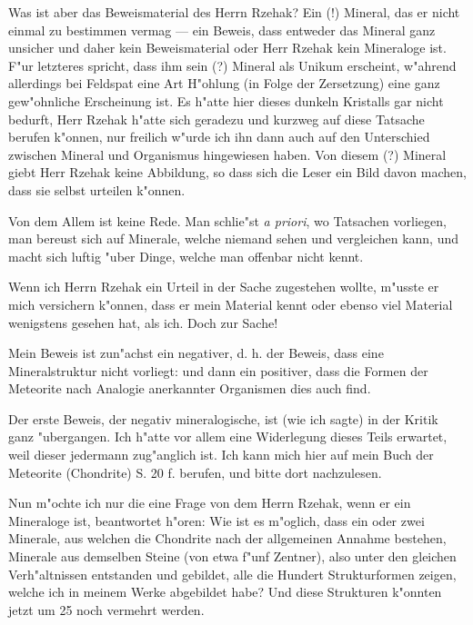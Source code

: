 \documentclass[a4paper, 12pt, oneside]{article}
\begin{document}
Was ist aber das Beweismaterial des Herrn Rzehak? Ein (!) Mineral, das er nicht einmal zu bestimmen vermag --- ein Beweis, dass entweder das Mineral ganz unsicher und daher kein Beweismaterial oder Herr Rzehak kein Mineraloge ist. F"ur letzteres spricht, dass ihm sein (?) Mineral als Unikum erscheint, w"ahrend allerdings bei Feldspat eine Art H"ohlung (in Folge der Zersetzung) eine ganz gew"ohnliche Erscheinung ist. Es h"atte hier dieses dunkeln Kristalls gar nicht bedurft, Herr Rzehak h"atte sich geradezu und kurzweg auf diese Tatsache berufen k"onnen, nur freilich w"urde ich ihn dann auch auf den Unterschied zwischen Mineral und Organismus hingewiesen haben. Von diesem (?) Mineral giebt Herr Rzehak keine Abbildung, so dass sich die Leser ein Bild davon machen, dass sie selbst urteilen k"onnen.

Von dem Allem ist keine Rede. Man schlie"st \emph{a priori}, wo Tatsachen vorliegen, man bereust sich auf Minerale, welche niemand sehen und vergleichen kann, und macht sich luftig "uber Dinge, welche man offenbar nicht kennt.

Wenn ich Herrn Rzehak ein Urteil in der Sache zugestehen wollte, m"usste er mich versichern k"onnen, dass er mein Material kennt oder ebenso viel Material wenigstens gesehen hat, als ich. Doch zur Sache!

Mein Beweis ist zun"achst ein negativer, d. h. der Beweis, dass eine Mineralstruktur nicht vorliegt: und dann ein positiver, dass die Formen der Meteorite nach Analogie anerkannter Organismen dies auch find.

Der erste Beweis, der negativ mineralogische, ist (wie ich sagte) in der Kritik ganz "ubergangen. Ich h"atte vor allem eine Widerlegung dieses Teils erwartet, weil dieser jedermann zug"anglich ist. Ich kann mich hier auf mein Buch der Meteorite (Chondrite) S. 20 f. berufen, und bitte dort nachzulesen.

Nun m"ochte ich nur die eine Frage von dem Herrn Rzehak, wenn er ein Mineraloge ist, beantwortet h"oren: Wie ist es m"oglich, dass ein oder zwei Minerale, aus welchen die Chondrite nach der allgemeinen Annahme bestehen, Minerale aus demselben Steine (von etwa f"unf Zentner), also unter den gleichen Verh"altnissen entstanden und gebildet, alle die Hundert Strukturformen zeigen, welche ich in meinem Werke abgebildet habe? Und diese Strukturen k"onnten jetzt um 25 noch vermehrt werden.
\end{document}
